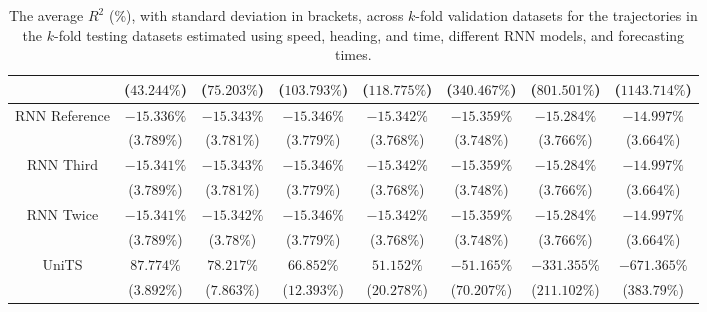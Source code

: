 \begin{table}[!ht]
{\begin{tabular}{|c|c|c|c|c|c|c|c|}
			 & ($43.244\%$) & ($75.203\%$) & ($103.793\%$) & ($118.775\%$) & ($340.467\%$) & ($801.501\%$) & ($1143.714\%$) \\ \hline
			\multirow{2}{*}{RNN Reference} & $-15.336\%$ & $-15.343\%$ & $-15.346\%$ & $-15.342\%$ & $-15.359\%$ & $-15.284\%$ & $-14.997\%$ \\
			 & ($3.789\%$) & ($3.781\%$) & ($3.779\%$) & ($3.768\%$) & ($3.748\%$) & ($3.766\%$) & ($3.664\%$) \\ \hline
			\multirow{2}{*}{RNN Third} & $-15.341\%$ & $-15.343\%$ & $-15.346\%$ & $-15.342\%$ & $-15.359\%$ & $-15.284\%$ & $-14.997\%$ \\
			 & ($3.789\%$) & ($3.781\%$) & ($3.779\%$) & ($3.768\%$) & ($3.748\%$) & ($3.766\%$) & ($3.664\%$) \\ \hline
			\multirow{2}{*}{RNN Twice} & $-15.341\%$ & $-15.342\%$ & $-15.346\%$ & $-15.342\%$ & $-15.359\%$ & $-15.284\%$ & $-14.997\%$ \\
			 & ($3.789\%$) & ($3.78\%$) & ($3.779\%$) & ($3.768\%$) & ($3.748\%$) & ($3.766\%$) & ($3.664\%$) \\ \hline
			\multirow{2}{*}{UniTS} & $87.774\%$ & $78.217\%$ & $66.852\%$ & $51.152\%$ & $-51.165\%$ & $-331.355\%$ & $-671.365\%$ \\
			 & ($3.892\%$) & ($7.863\%$) & ($12.393\%$) & ($20.278\%$) & ($70.207\%$) & ($211.102\%$) & ($383.79\%$) \\ \hline
		\end{tabular}
	}
	\caption{The average $R^{2}$ (\%), with standard deviation in brackets, across $k$-fold validation datasets for the trajectories in the $k$-fold testing datasets estimated using speed, heading, and time, different RNN models, and forecasting times.}
	\label{tab:all_speed_actual_dir_R2}
\end{table}